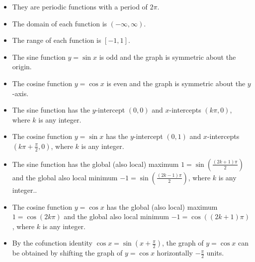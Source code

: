 \begin{note}
\begin{itemize}
  \item They are periodic functions with a period of $2\pi$.
  \item The domain of each function is $(-\infty, \infty)$.
  \item The range of each function is $[-1,1]$.
  \item The sine function $y=\sin x$ is odd and the graph is symmetric about the origin. 
  \item The cosine function $y=\cos x$ is even and the graph is symmetric about the $y$-axis. 
  \item The sine function has the $y$-intercept $(0, 0)$ and $x$-intercepts $(k\pi, 0)$, where $k$ is any integer.
  \item The cosine function $y=\sin x$ has the $y$-intercept $(0, 1)$ and $x$-intercepts $\left(k\pi+\frac{\pi}{2}, 0\right)$, where $k$ is any integer.
  \item The sine function has the global (also local) maximum $1=\sin\left(\frac{(2k+1)\pi}{2}\right)$ and the global {also local} minimum $-1=\sin\left(\frac{(2k-1)\pi}{2}\right)$, where $k$ is any integer..
  \item The cosine function $y=\cos x$ has the global (also local) maximum $1=\cos\left(2k\pi\right)$ and the global {also local} minimum $-1=\cos\left((2k+1)\pi\right)$, where $k$ is any integer.
  \item By the cofunction identity $\cos x=\sin(x+\frac{\pi}{2})$, the graph of $y=\cos x$ can be obtained by shifting the graph of $y=\cos x$ horizontally $-\frac{\pi}{2}$ units.
\end{itemize}
\end{note}
\begin{center}
\end{center}

